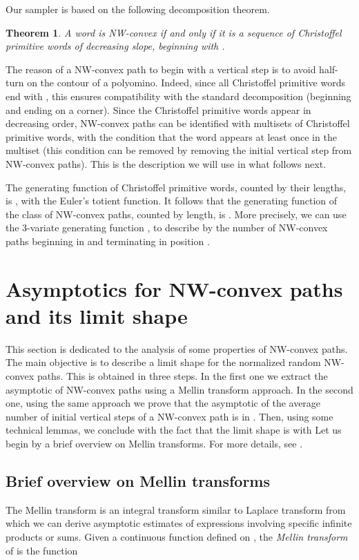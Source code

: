 \documentclass{article}
\newtheorem{theorem}{Theorem}[section]
\begin{document}
Our sampler is based on the following decomposition theorem. 


\begin{theorem}\cite{Brlek09a}
A word is NW-convex if and only if it is a sequence of Christoffel primitive words of decreasing slope, beginning with .
\end{theorem}

The reason of a NW-convex path to begin with a vertical step is to
avoid half-turn on the contour of a polyomino. Indeed, since all
Christoffel primitive words end with , this ensures compatibility
with the standard decomposition (beginning and ending on a
corner).  Since the Christoffel primitive words appear in
decreasing order, NW-convex paths can be identified with multisets
of Christoffel primitive words, with the condition that the word
 appears at least once in the multiset (this condition can be
removed by removing the initial vertical step from NW-convex
paths).  This is the description we will use in what follows
next.

The generating function of Christoffel primitive words, counted by
their lengths, is , with
 the Euler's totient function. It follows \cite[p.~29]{Flajolet2009}
that the
generating function of the class  of NW-convex paths,
counted by length, is . More precisely, we can use the 3-variate generating function 
, to describe by  the number of NW-convex paths beginning in  and terminating in position .



\section{Asymptotics for NW-convex paths and its limit shape}
\label{limitshape}

This section is dedicated to the analysis of some properties of NW-convex paths. 
The main objective is to describe a limit shape for the normalized random NW-convex paths. This is obtained in three steps. 
In the first one we extract the asymptotic of NW-convex paths using a Mellin transform approach. 
In the second one, using the same approach we prove that the asymptotic of the average number of initial vertical steps of a NW-convex path is
 in . Then, using some technical lemmas, we conclude with the fact that the limit shape
 is  with  Let us begin by a brief overview on Mellin transforms. For more details, see \cite{Flajolet2009}.

\subsection{Brief overview on Mellin  transforms}
\label{MellinOverview}
The Mellin transform is an integral transform similar to Laplace
transform from which we can derive asymptotic estimates of
expressions involving specific infinite products or sums.  Given a
continuous function  defined on , the
\emph{Mellin transform} of  is the function
\end{document}
